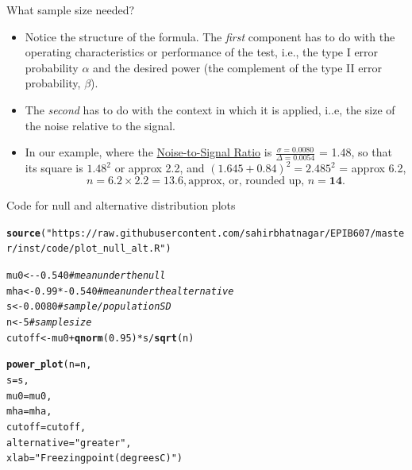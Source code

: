 \documentclass[10pt]{beamer}\usepackage[]{graphicx}\usepackage[]{color}
\makeatletter
\newcommand{\hlnum}[1]{\textcolor[rgb]{0.686,0.059,0.569}{#1}}%
\newcommand{\hlstr}[1]{\textcolor[rgb]{0.192,0.494,0.8}{#1}}%
\newcommand{\hlcom}[1]{\textcolor[rgb]{0.678,0.584,0.686}{\textit{#1}}}%
\newcommand{\hlopt}[1]{\textcolor[rgb]{0,0,0}{#1}}%
\newcommand{\hlstd}[1]{\textcolor[rgb]{0.345,0.345,0.345}{#1}}%
\newcommand{\hlkwb}[1]{\textcolor[rgb]{0.69,0.353,0.396}{#1}}%
\newcommand{\hlkwc}[1]{\textcolor[rgb]{0.333,0.667,0.333}{#1}}%
\newcommand{\hlkwd}[1]{\textcolor[rgb]{0.737,0.353,0.396}{\textbf{#1}}}%
\newenvironment{kframe}{%
 \def\at@end@of@kframe{}%
 \ifinner\ifhmode%
  \def\at@end@of@kframe{\end{minipage}}%
  \begin{minipage}{\columnwidth}%
 \fi\fi%
 \def\FrameCommand##1{\hskip\@totalleftmargin \hskip-\fboxsep
 \colorbox{shadecolor}{##1}\hskip-\fboxsep
     \hskip-\linewidth \hskip-\@totalleftmargin \hskip\columnwidth}%
 \MakeFramed {\advance\hsize-\width
   \@totalleftmargin\z@ \linewidth\hsize
   \@setminipage}}%
 {\par\unskip\endMakeFramed%
 \at@end@of@kframe}
\newenvironment{knitrout}{}{} %
\makeatother
\begin{document}
\begin{frame}{What sample size needed?}
	\begin{itemize}
		\setlength\itemsep{1em}
		\item Notice the structure of the formula. The \textit{first} component has to do
		with the operating characteristics or performance of the test, i.e.,
		the type I error probability $\alpha$ and the desired power (the complement of the type II error probability, $\beta$).
		
		\pause 
		
		\item The \textit{second} has to do	with the context in which it is applied, i..e, the size of the noise relative to the  signal. \pause 
		
		\item In our example, where the \underline{Noise-to-Signal Ratio} is $\frac{\sigma = 0.0080}{\Delta = 0.0054}$ = 1.48, so that its square is $1.48^2$ or approx 2.2,	and $(1.645 + 0.84)^2 = 2.485^2$ = approx 6.2,	$$  n = 6.2  \times 2.2  =  13.6, \textrm{approx, or, rounded up,  } n = \textbf{14}. $$
	\end{itemize}
\end{frame}



\begin{frame}[fragile]{Code for null and alternative distribution plots}
\begin{knitrout}\tiny
{}\color{fgcolor}\begin{kframe}
\begin{alltt}
\hlkwd{source}\hlstd{(}\hlstr{"https://raw.githubusercontent.com/sahirbhatnagar/EPIB607/master/inst/code/plot_null_alt.R"}\hlstd{)}

\hlstd{mu0} \hlkwb{<-} \hlopt{-}\hlnum{0.540} \hlcom{# mean under the null}
\hlstd{mha} \hlkwb{<-} \hlnum{0.99}\hlopt{*-}\hlnum{0.540} \hlcom{# mean under the alternative}
\hlstd{s} \hlkwb{<-} \hlnum{0.0080} \hlcom{# sample/population SD}
\hlstd{n} \hlkwb{<-} \hlnum{5} \hlcom{# sample size}
\hlstd{cutoff} \hlkwb{<-} \hlstd{mu0} \hlopt{+} \hlkwd{qnorm}\hlstd{(}\hlnum{0.95}\hlstd{)} \hlopt{*} \hlstd{s} \hlopt{/} \hlkwd{sqrt}\hlstd{(n)}

\hlkwd{power_plot}\hlstd{(}\hlkwc{n} \hlstd{= n,}
\hlkwc{s} \hlstd{= s,}
\hlkwc{mu0} \hlstd{= mu0,}
\hlkwc{mha} \hlstd{= mha,}
\hlkwc{cutoff} \hlstd{= cutoff,}
\hlkwc{alternative} \hlstd{=} \hlstr{"greater"}\hlstd{,}
\hlkwc{xlab} \hlstd{=} \hlstr{"Freezing point (degrees C)"}\hlstd{)}
\end{alltt}
\end{kframe}
\end{knitrout}
\end{frame}
\end{document}
